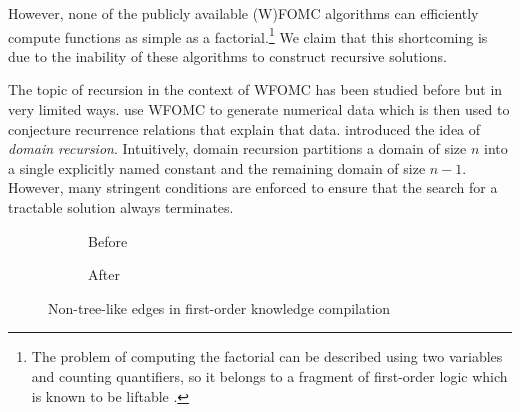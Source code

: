 However, none of the publicly available (W)FOMC algorithms can efficiently compute functions as simple as a factorial.\footnote{The problem of computing the factorial can be described using two variables and counting quantifiers, so it belongs to a fragment of first-order logic which is known to be liftable \citep{DBLP:journals/jair/Kuzelka21}.} We claim that this shortcoming is due to the inability of these algorithms to construct recursive solutions.


The topic of recursion in the context of WFOMC has been studied before but in very limited ways.  use WFOMC to generate numerical data which is then used to conjecture recurrence relations that explain that data.  introduced the idea of \emph{domain recursion}. Intuitively, domain recursion partitions a domain of size $n$ into a single explicitly named constant and the remaining domain of size $n-1$. However, many stringent conditions are enforced to ensure that the search for a tractable solution always terminates.



\begin{figure}
\centering
\begin{subfigure}{0.49\textwidth}
\caption{Before}
\label{fig:before}
\end{subfigure}
\begin{subfigure}{0.49\textwidth}
\centering
{}
\caption{After}
\label{fig:after}
\end{subfigure}
\caption{Non-tree-like edges in first-order knowledge compilation}
\end{figure}

